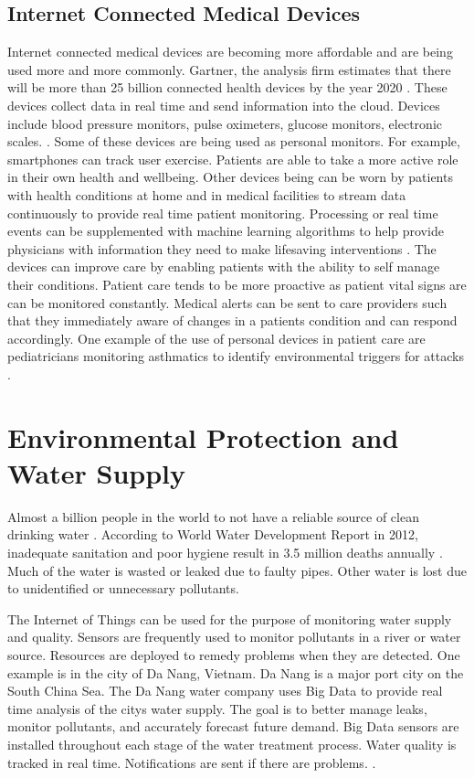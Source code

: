 \documentclass[sigconf]{acmart}
\begin{document}
\subsection{Internet Connected Medical Devices}
Internet connected medical devices are becoming more affordable and are being used more and more commonly.  Gartner, the analysis firm estimates that there will be more than 25 billion connected health devices by the year 2020 \cite{HlthCat}. These devices collect data in real time and send information into the cloud. Devices include blood pressure monitors, pulse oximeters, glucose monitors, electronic scales. \cite{HlthCat}.  Some of these devices are being used as personal monitors. For example, smartphones can track user exercise.  Patients are able to take a more active role in their own health and wellbeing.  Other devices being can be worn by patients with health conditions at home and in medical facilities to stream data continuously to provide real time patient monitoring.  Processing or real time events can be supplemented with machine learning algorithms to help provide physicians with information they need to make lifesaving interventions \cite{McDonald}.  The devices can improve care by enabling patients with the ability to self manage their conditions. Patient care tends to be more proactive as patient vital signs are can be monitored constantly. Medical alerts can be sent to care providers such that they immediately aware of changes in a patients condition and can respond accordingly. One example of the use of personal devices in patient care are pediatricians monitoring asthmatics to identify environmental triggers for attacks \cite{CIO}.
\section{Environmental Protection and Water Supply}

Almost a billion people in the world to not have a reliable source of clean drinking water \cite{www-google-top10}. According to World Water Development Report in 2012, inadequate sanitation and poor hygiene result in 3.5 million deaths annually \cite{DevEcon}. Much of the water is wasted or leaked due to faulty pipes. Other water is lost due to unidentified or unnecessary pollutants.

The Internet of Things can be used for the purpose of monitoring water supply and quality. Sensors are frequently used to monitor pollutants in a river or water source. Resources are deployed to remedy problems when they are detected.  One example is in the city of Da Nang, Vietnam. Da Nang is a major port city on the South China Sea. The Da Nang water company uses Big Data to provide real time analysis of the citys water supply. The goal is to better manage leaks, monitor pollutants, and accurately forecast future demand. Big Data sensors are installed throughout each stage of the water treatment process. Water quality is tracked in real time. Notifications are sent if there are problems. \cite{DevEcon}.
\end{document}
